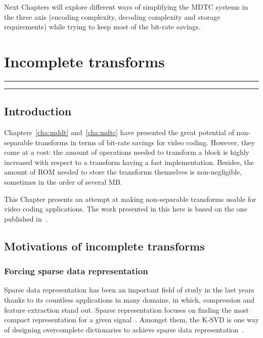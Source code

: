 \documentclass[11pt,a4paper,openright,twoside]{book}
\providecommand{\chaptertoc}{
	\startcontents[chapters]
	\hrule
	\vspace{1em}
	\printcontents[chapters]{}{1}{{\sf\large\bfseries Contents}}
	\hrule
}
\numberwithin{equation}{section} %
\numberwithin{figure}{section} %
\numberwithin{table}{section} %
\begin{document}
Next Chapters will explore different ways of simplifying the \ac{MDTC} systems
in the three axis (encoding complexity, decoding complexity and storage
requirements) while trying to keep most of the bit-rate savings.

\chapter{Incomplete transforms}
\label{cha:incomplete_transforms}
\chaptertoc

\section{Introduction}
\label{sec:it_introduction}

Chapters~\ref{cha:mddt} and~\ref{cha:mdtc} have presented the great potential
of non-separable transforms in terms of bit-rate savings for video coding.
However, they come at a cost:
the amount of operations needed to transform a block is highly increased with
respect to a transform having a fast implementation.
Besides, the amount of \acs{ROM} needed to store the transforms themselves is
non-negligible, sometimes in the order of several MB.

This Chapter presents an attempt at making non-separable transforms usable for
video coding applications.
The work presented in this here is based on the one published
in~\cite{arrufat-15-inc-transforms}.

\section{Motivations of incomplete transforms}
\label{sec:it_motivations}

\subsection{Forcing sparse data representation}
\label{sub:it_forcing_sparse_data_representation}

Sparse data representation has been an important field of study in the last
years thanks to its countless applications in many domains, in which,
compression and feature extraction stand out.
Sparse representation focuses on finding the most compact representation for a
given signal~\cite{huang-06-sparse-representation}.
Amongst them, the K-\acs{SVD} is one way of designing overcomplete
dictionaries to achieve sparse data
representation~\cite{aharon-06-overcomplete-sparse-dict}.
\end{document}
